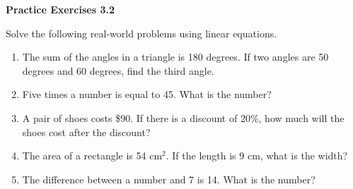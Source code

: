  \vspace{1ex}
\noindent\textbf{Practice Exercises 3.2}

\vspace{0.75ex}

Solve the following real-world problems using linear equations. 

\begin{enumerate}[noitemsep, label = \color{blue}\arabic*. ]
    \item The sum of the angles in a triangle is 180 degrees. If two angles are 50 degrees and 60 degrees, find the third angle.
    \item Five times a number is equal to 45. What is the number?
    \item A pair of shoes costs \$90. If there is a discount of 20\%, how much will the shoes cost after the discount?
    \item The area of a rectangle is 54 cm$^2$. If the length is 9 cm, what is the width?
    \item The difference between a number and 7 is 14. What is the number?
\end{enumerate}

